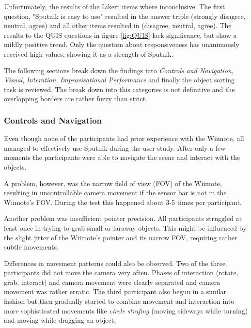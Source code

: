 \documentclass[10pt,a4paper]{scrartcl}
\begin{document}
Unfortunately, the results of the Likert items where inconclusive: The first question, "Sputnik is easy to use" resulted in the answer triple (strongly disagree, neutral, agree) and all other items resulted in (disagree, neutral, agree). The results to the QUIS questions in figure \ref{fig:QUIS} lack significance, but show a mildly positive trend. Only the question about responsiveness has unanimously received high values, showing it as a strength of Sputnik.

The following sections break down the findings into \emph{Controls and Navigation}, \emph{Visual}, \emph{Interation}, \emph{Improvisational Performance} and finally the object sorting task is reviewed. The break down into this categories is not definitive and the overlapping borders are rather fuzzy than strict.


\subsubsection{Controls and Navigation}
Even though none of the participants had prior experience with the Wiimote, all managed to effectively use Sputnik during the user study. After only a few moments the participants were able to navigate the scene and interact with the objects. 

A problem, however, was the narrow field of view (FOV) of the Wiimote, resulting in uncontrollable camera movement if the sensor bar is not in the Wiimote's FOV. During the test this happened about 3-5 times per participant.

Another problem was insufficient pointer precision. All participants struggled at least once in trying to grab small or faraway objects. This might be influenced by the slight jitter of the Wiimote's pointer and its narrow FOV, requiring rather subtle movements.

Differences in movement patterns could also be observed. Two of the three participants did not move the camera very often. Phases of interaction (rotate, grab, interact) and camera movement were clearly separated and camera movement was rather erratic. The third participant also begun in a similar fashion but then gradually started to combine movement and interaction into more sophisticated movements like \emph{circle strafing} (moving sideways while turning) and moving while dragging an object.
\end{document}
